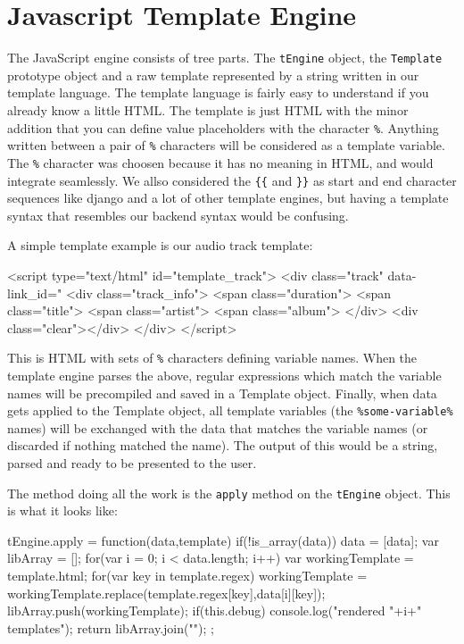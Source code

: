 \section{Javascript Template Engine}

The JavaScript engine consists of tree parts. The 
\lstinline$tEngine$ object, the \lstinline$Template$ prototype object 
and a raw template represented by a string written in our template language. 
The template language is fairly easy to understand if you already know a little HTML. 
The template is just HTML with the minor addition that you can define value placeholders with the character \verb$%$. 
Anything written between a pair of \verb$%$ characters will be considered as a template variable. 
The \verb$%$ character was choosen because it has no meaning in HTML, and would integrate seamlessly. 
We allso considered the \verb${{$ and \verb$}}$ as start and end character 
sequences like django and a lot of other template engines, 
but having a template syntax that resembles our backend syntax would be confusing.

A simple template example is our audio track template:

\begin{snippet}[language=HTML,caption=The template used to represent audio tracks]
<script type="text/html" id="template_track">
	<div class="track" data-link_id="%
		<div class="track_info">
			<span class="duration">%
			<span class="title">%
			<span class="artist">%
			<span class="album">%
		</div>
		<div class="clear"></div>
	</div>
</script>
\end{snippet}
 
This is HTML with sets of \verb$%$ characters defining variable names. 
When the template engine parses the above, regular expressions which match the variable names will be precompiled and saved in a Template object. 
Finally, when data gets applied to the Template object, 
all template variables (the \verb$%some-variable%$ names) will be exchanged with 
the data that matches the variable names (or discarded if nothing matched the name).
The output of this would be a string, parsed and ready to be presented to the user.


The method doing all the work is the \verb$apply$ method on the \verb$tEngine$ object.
This is what it looks like:


\begin{snippet}[language=JavaScript,caption=The javascript engine apply method]
tEngine.apply = function(data,template) {
    if(!is_array(data)) {
        data = [data];
    }
    var libArray = [];
    for(var i = 0; i < data.length; i++) {
        var workingTemplate = template.html;
        for(var key in template.regex) {
            workingTemplate = workingTemplate.replace(template.regex[key],data[i][key]);
        }
        libArray.push(workingTemplate);
    }
	if(this.debug) {
		console.log("rendered "+i+" templates");
	}
    return libArray.join("\n");
};
\end{snippet}

